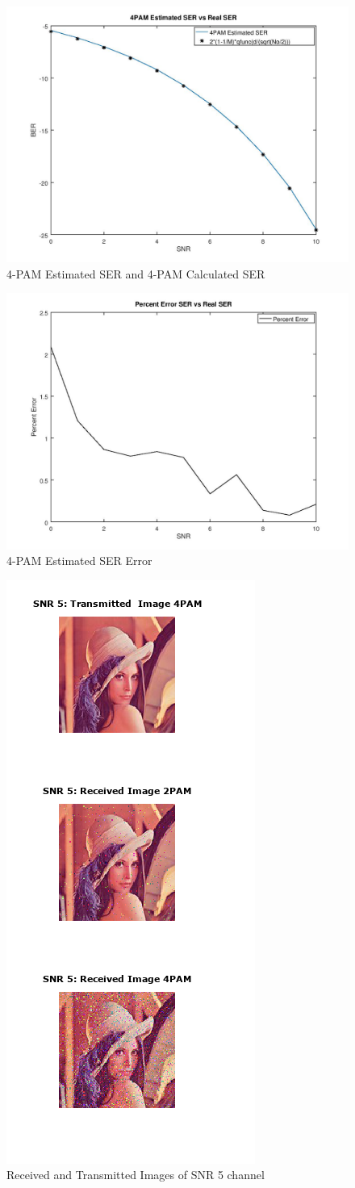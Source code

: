 \documentclass{article}
\begin{document}
\begin{figure}
        \centering 	\includegraphics[width=\linewidth]{4pamser.jpg}
    \caption{4-PAM Estimated SER and 4-PAM Calculated SER}
\end{figure}
\begin{figure}
        \centering 	\includegraphics[width=\linewidth]{errorser.jpg}
    \caption{4-PAM Estimated SER Error}
\end{figure}
\newpage
\clearpage
\begin{figure}
        \centering 	\includegraphics[width=.2\linewidth]{lena5.PNG}
    \caption{Received and Transmitted Images of SNR 5 channel}
\end{figure}
\end{document}
